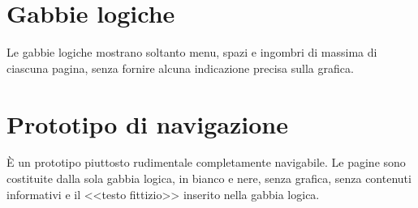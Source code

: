 \section{Gabbie logiche}\label{sec:gabbie-logiche}
Le gabbie logiche mostrano soltanto menu, spazi e ingombri di massima di 
ciascuna pagina, senza fornire alcuna indicazione precisa sulla grafica.

\section{Prototipo di navigazione}\label{sec:prototipo-navigazione}
È un prototipo piuttosto rudimentale completamente navigabile. Le pagine sono 
costituite dalla sola gabbia logica, in bianco e nere, senza grafica, senza 
contenuti informativi e il <<testo fittizio>> inserito nella gabbia logica.



